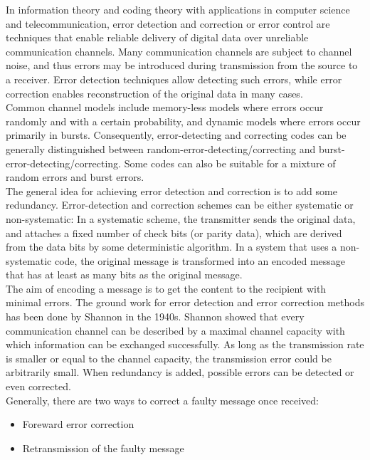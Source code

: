 %
In information theory and coding theory with applications in computer science and telecommunication, error detection and correction or error control are techniques that enable reliable delivery of digital data over unreliable communication channels. Many communication channels are subject to channel noise, and thus errors may be introduced during transmission from the source to a receiver. Error detection techniques allow detecting such errors, while error correction enables reconstruction of the original data in many cases.\\
Common channel models include memory-less models where errors occur randomly and with a certain probability, and dynamic models where errors occur primarily in bursts. Consequently, error-detecting and correcting codes can be generally distinguished between random-error-detecting/correcting and burst-error-detecting/correcting. Some codes can also be suitable for a mixture of random errors and burst errors.\\
The general idea for achieving error detection and correction is to add some redundancy. Error-detection and correction schemes can be either systematic or non-systematic: In a systematic scheme, the transmitter sends the original data, and attaches a fixed number of check bits (or parity data), which are derived from the data bits by some deterministic algorithm. In a system that uses a non-systematic code, the original message is transformed into an encoded message that has at least as many bits as the original message.\\
%
%
The aim of encoding a message is to get the content to the recipient with minimal errors. The ground work for error detection and error correction methods has been done by Shannon in the 1940s. Shannon showed that every communication channel can be described by a maximal channel capacity with which information can be exchanged successfully. As long as the transmission rate is smaller or equal to the channel capacity, the transmission error could be arbitrarily small. When redundancy is added, possible errors can be detected or even corrected.\\
Generally, there are two ways to correct a faulty message once received:
\begin{itemize}
    \item Foreward error correction
    \item Retransmission of the faulty message
\end{itemize}
%
%

